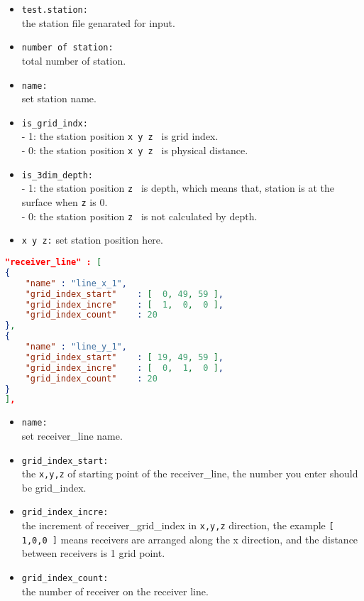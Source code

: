 \begin{itemize}
	\item \verb|test.station:| \\
	the station file genarated for input.
	\item \verb|number of station:| \\
	total number of station.
	\item \verb|name:| \\
	set station name.
	\item \verb|is_grid_indx:| \\
	- 1: the station position \verb|x y z | is grid index. \\
	- 0: the station position \verb|x y z | is physical distance.
	\item \verb|is_3dim_depth:| \\
	- 1: the station position \verb|z | is depth, which means that, station is at the surface when \verb|z| is 0.  \\
	- 0: the station position \verb|z | is not calculated by depth.
	\item \verb|x y z:|
	set station position here.
\end{itemize}
\begin{lstlisting}[language=json,
	caption=Example of setting receiver\_line,
	label={recv},commentstyle=\color{codegreen},
	frame=tb]	 
"receiver_line" : [
{
	"name" : "line_x_1",
	"grid_index_start"    : [  0, 49, 59 ],
	"grid_index_incre"    : [  1,  0,  0 ],
	"grid_index_count"    : 20
},
{
	"name" : "line_y_1",
	"grid_index_start"    : [ 19, 49, 59 ],
	"grid_index_incre"    : [  0,  1,  0 ],
	"grid_index_count"    : 20
} 
],
\end{lstlisting}
\begin{itemize}
	\item \verb|name:| \\
	set receiver\_line name.
	\item \verb|grid_index_start:| \\
	the \verb|x,y,z| of starting point of the receiver\_line, the number you enter should be grid\_index.
	\item \verb|grid_index_incre:| \\
	the increment of receiver\_grid\_index in \verb|x,y,z| direction, the example \verb|[ 1,0,0 ]| means receivers are arranged along the x direction, and the distance between receivers is 1 grid point.
	\item \verb|grid_index_count:| \\
	the number of receiver on the receiver line. 
\end{itemize}
